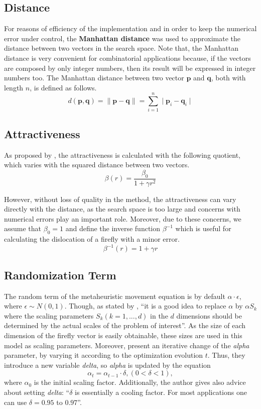 \documentclass[tuberlin,cic,tc,openright,english,noabntcite,oneside]{iiufrgs}
\begin{document}
\subsection{Distance}
For reasons of efficiency of the implementation and in order to keep the numerical error under control, the \textbf{Manhattan distance} was used to approximate the distance between two vectors in the search space. Note that, the Manhattan distance is very convenient for combinatorial applications because, if the vectors are composed by only integer numbers, then its result will be expressed in integer numbers too. The Manhattan distance between two vector $\mathbf{p}$ and $\mathbf{q}$, both with length $n$, is defined as follows.
$$d(\mathbf{p},\mathbf{q}) = \parallel \mathbf{p} - \mathbf{q} \parallel = \sum_{i=1}^{n} \mid \mathbf{p}_{i}-\mathbf{q}_{i} \mid$$

\subsection{Attractiveness}\label{sec:attractiveness}
As proposed by \textcite[p. 173]{yang_firefly_2009}, the attractiveness is calculated with the following quotient, which varies with the squared distance between two vectors.
$$\beta(r) = \frac{\beta_{0}}{1 + \gamma r^2}$$

However, without loss of quality in the method, the attractiveness can vary directly with the distance, as the search space is too large and concerns with numerical errors play an important role. Moreover, due to these concerns, we assume that $\beta_0 = 1$ and define the inverse function $\beta^{-1}$ which is useful for calculating the dislocation of a firefly with a minor error.
$$\beta^{-1}(r) = 1 + \gamma r$$

\subsection{Randomization Term}\label{sec:random_term}
The random term of the metaheuristic movement equation is by default $\alpha \cdot \epsilon$, where $\epsilon \sim N(0,1)$. Though, as stated by \textcite[p. 80]{yang_firefly_2010}, \enquote{it is a good idea to replace $\alpha$ by $\alpha S_k$ where the scaling parameters $S_k (k=1,...,d)$ in the $d$ dimensions should be determined by the actual scales of the problem of interest}. As the size of each dimension of the firefly vector is easily obtainable, these sizes are used in this model as scaling parameters. Moreover, \textcite[p. 37-38]{yang_firefly_2013} present an iterative change of the \emph{alpha} parameter, by varying it according to the optimization evolution $t$. Thus, they introduce a new variable \emph{delta}, so \emph{alpha} is updated by the equation
$$ \alpha_t = \alpha_{t-1} \cdot \delta, (0 < \delta < 1),$$ where $\alpha_0$ is the initial scaling factor. Additionally, the author gives also advice about setting \emph{delta}: \enquote{$\delta$ is essentially a cooling factor. For most applications one can use $\delta = 0.95$ to $0.97$}.
\end{document}
